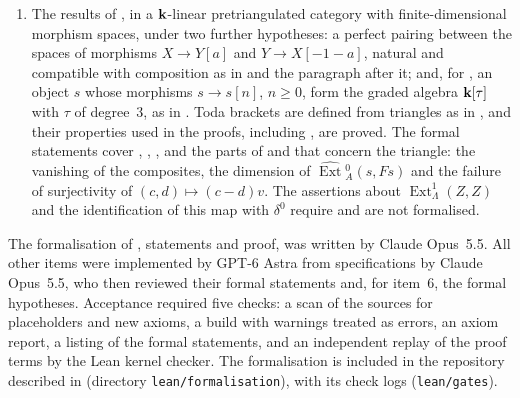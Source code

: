 \begin{enumerate}
    without the assertion about $K_0$, with the objects $C$ and $V$ and their
    decompositions constructed from the two cones of the proof.
  \item The results of , in a $\mathbf{k}$-linear
    pretriangulated category with finite-dimensional morphism spaces, under
    two further hypotheses: a perfect pairing between the spaces of morphisms
    ${X\to Y[a]}$ and ${Y\to X[-1-a]}$, natural and compatible with composition
    as in  and the paragraph after it; and, for
    , an object $s$ whose
    morphisms ${s\to s[n]}$, ${n\geq0}$, form the graded algebra $\mathbf{k}[\tau]$ with
    $\tau$ of degree~$3$, as in . Toda brackets are defined
    from triangles as in , and their properties used in the
    proofs, including , are proved. The formal
    statements cover , ,
    , and the parts of  and
     that concern the triangle: the vanishing of the
    composites, the dimension of $\widehat{\operatorname{Ext}}{}^0_A(s,Fs)$
    and the failure of surjectivity of ${(c,d)\mapsto(c-d)v}$. The assertions
    about $\operatorname{Ext}^1_\Lambda(Z,Z)$ and the identification of this
    map with $\delta^0$ require  and are not formalised.
\end{enumerate}
The formalisation of , statements and proof, was
written by Claude Opus~5.5. All other items were implemented by GPT-6 Astra
from specifications by Claude Opus~5.5, who then reviewed their formal
statements and, for item~6, the formal hypotheses. Acceptance required
five checks: a scan of the
sources for placeholders and new axioms, a build with warnings treated as
errors, an axiom report, a listing of the formal statements, and an
independent replay of the proof terms by the Lean kernel checker. The
formalisation is included in the repository described in
 (directory \texttt{lean/formalisation}), with its check
logs (\texttt{lean/gates}).

